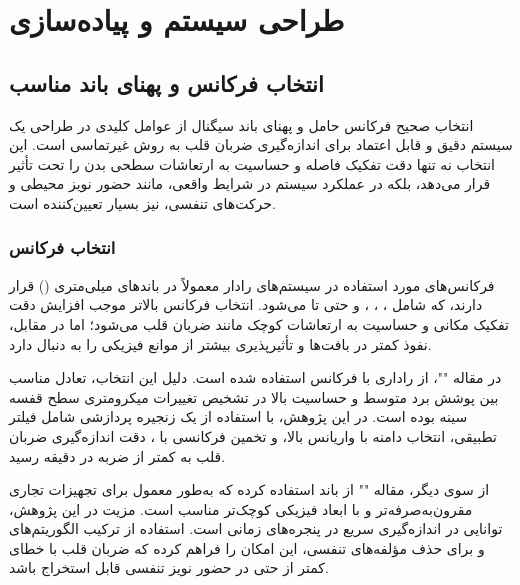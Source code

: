 \chapter{طراحی سیستم و پیاده‌سازی} %
\label{ch:system-design-implementation}

\section{انتخاب فرکانس و پهنای باند مناسب} %
\label{sec:freq-bandwidth-selection}

انتخاب صحیح فرکانس حامل و پهنای باند سیگنال  از عوامل کلیدی در طراحی یک سیستم دقیق و قابل اعتماد برای اندازه‌گیری ضربان قلب به روش غیرتماسی است. این انتخاب نه تنها دقت تفکیک فاصله و حساسیت به ارتعاشات سطحی بدن را تحت تأثیر قرار می‌دهد، بلکه در عملکرد سیستم در شرایط واقعی، مانند حضور نویز محیطی و حرکت‌های تنفسی، نیز بسیار تعیین‌کننده است.

\subsection{انتخاب فرکانس} %
\label{sec:frequency-selection}

فرکانس‌های مورد استفاده در سیستم‌های رادار  معمولاً در باندهای میلی‌متری () قرار دارند، که شامل ، ، ، و حتی تا  می‌شود. انتخاب فرکانس بالاتر موجب افزایش دقت تفکیک مکانی و حساسیت به ارتعاشات کوچک مانند ضربان قلب می‌شود؛ اما در مقابل، نفوذ کمتر در بافت‌ها و تأثیرپذیری بیشتر از موانع فیزیکی را به دنبال دارد.

در مقاله ""، از راداری با فرکانس  استفاده شده است. دلیل این انتخاب، تعادل مناسب بین پوشش برد متوسط و حساسیت بالا در تشخیص تغییرات میکرومتری سطح قفسه سینه بوده است. در این پژوهش، با استفاده از یک زنجیره پردازشی شامل فیلتر تطبیقی، انتخاب دامنه با واریانس بالا، و تخمین فرکانسی با ، دقت اندازه‌گیری ضربان قلب به کمتر از  ضربه در دقیقه رسید.

از سوی دیگر، مقاله "" از باند  استفاده کرده که به‌طور معمول برای تجهیزات تجاری مقرون‌به‌صرفه‌تر و با ابعاد فیزیکی کوچک‌تر مناسب است. مزیت  در این پژوهش، توانایی در اندازه‌گیری سریع در پنجره‌های زمانی  است. استفاده از ترکیب الگوریتم‌های  و  برای حذف مؤلفه‌های تنفسی، این امکان را فراهم کرده که ضربان قلب با خطای کمتر از  حتی در حضور نویز تنفسی قابل استخراج باشد.

